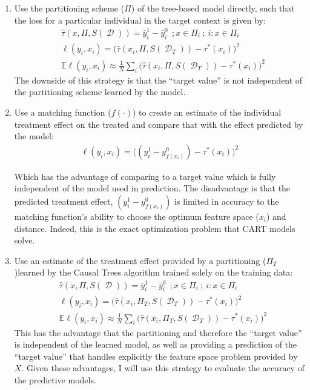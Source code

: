 \documentclass[a4paper,12pt]{article}
\DeclareMathOperator*{\D}{\mathcal{D}}
\begin{document}
\begin{enumerate}
\item Use the partitioning scheme ($\Pi$) of the tree-based model directly, such that the loss for a particular individual in the target context is given by:
%
\begin{align*}
&\hat{\tau}(x, \Pi, S(\D)) =  \bar{y}^1_i - \bar{y}^0_i \ \ ; x \in \Pi_i\ ; \ i : x \in \Pi_i \\
&\ell(y_i, x_i) = \big(\hat{\tau}(x_i, \Pi, S(\D_{T})) - \tau^*(x_i) \big)^2 \\
&\mathbb{E}\ell(y_i, x_i) \approx \frac{1}{N} \sum_i \big(\hat{\tau}(x_i, \Pi, S(\D_{T})) - \tau^*(x_i) \big)^2
\end{align*}
%
The downside of this strategy is that the ``target value'' is not independent of the partitioning scheme learned by the model.

\item Use a matching function ($f(\cdot)$) to create an estimate of the individual treatment effect on the treated and compare that with the effect predicted by the model:
%
\begin{align*}
\ell(y_i, x_i) = \big( (y^1_i - y^0_{f(x_i)} ) - \tau^*(x_i) \big)^2
\end{align*}

Which has the advantage of comparing to a target value which is fully independent of the model used in prediction. The disadvantage is that the predicted treatment effect, $(y^1_i - y^0_{f(x_i)} )$ is limited in accuracy to the matching function's ability to choose the optimum feature space ($x_i$) and distance. Indeed, this is the exact optimization problem that CART models solve.

\item Use an estimate of the treatment effect provided by a partitioning ($\Pi_T$)learned by the Causal Trees algorithm trained solely on the training data:
\begin{align*}
&\hat{\tau}(x, \Pi, S(\D)) =  \bar{y}^1_i - \bar{y}^0_i \ \ ; x \in \Pi_i\ ; \ i : x \in \Pi_i \\
&\ell(y_i, x_i) = \big(\hat{\tau}(x_i, \Pi_T, S(\D_{T})) - \tau^*(x_i) \big)^2 \\
&\mathbb{E}\ell(y_i, x_i) \approx \frac{1}{N} \sum_i \big(\hat{\tau}(x_i, \Pi_T, S(\D_{T})) - \tau^*(x_i) \big)^2
\end{align*}
%
This has the advantage that the partitioning and therefore the ``target value'' is independent of the learned model, as well as providing a prediction of the ``target value'' that handles explicitly the feature space problem provided by $X$. Given these advantages, I will use this strategy to evaluate the accuracy of the predictive models.

\end{enumerate}
\end{document}
